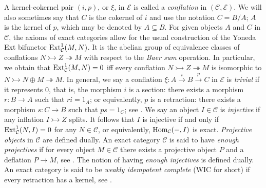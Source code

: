 \documentclass[reqno,12pt]{amsart}
\numberwithin{equation}{section}
\def\Ext{\mbox{\rm Ext}} \def\Tor{\mbox{\rm Tor}}\def\Hom{\mbox{\rm Hom}} \def\dim{\mbox{\rm dim}} \def\Iso{\mbox{\rm Iso}}
\def\dim{\mbox{\rm dim}}\def\Irr{\mbox{\rm Irr}}\def\rad{\mbox{\rm rad}}\def\fg{\mbox{\rm fg}}
\theoremstyle{plain}
\theoremstyle{definition}
\begin{document}
A kernel-cokernel pair $(i,p)$, or $\xi$, in $\mathcal{E}$ is called a {\it conflation} in
$(\mathcal{C},\mathcal{E})$. We will also sometimes say that $C$ is the cokernel of $i$ and
use the notation $C=B/A$; $A$ is the kernel of $p$, which may be denoted by $A\subseteq B$.
For given objects $A$ and $C$ in $\mathcal{C}$, the axioms of exact categories allow
for the usual construction of the Yoneda Ext bifunctor $\Ext^1_{\mathcal{C}}(M,N)$. It is the
abelian group of equivalence classes of conflations $N\rightarrowtail Z\twoheadrightarrow M$
with respect to the {\it Baer sum} operation. In particular, we obtain that
$\Ext^1_{\mathcal{C}}(M,N)=0$ iff every conflation $N\rightarrowtail Z\twoheadrightarrow M$ is
isomorphic to $N\rightarrowtail N\oplus M\twoheadrightarrow M$. In general, we say a conflation
$\xi:A\stackrel{i}\to B \stackrel{p}\to C$ in $\mathcal{E}$ is {\it trivial} if it represents
$0$, that is, the morphism $i$ is a section: there exists a morphism $r:B\to A$ such that
$ri=1_A$; or equivalently, $p$ is a retraction: there exists a morphism $s:C\to B$ such
that $ps=1_C$; see \cite[Remark 7.4]{B10}.
We say an object $I\in\mathcal{C}$ is {\it injective} if any inflation $I\rightarrowtail Z$
splits. It follows that $I$ is injective if and only if $\Ext^1_{\mathcal{C}}(N,I)=0$ for
any $N\in\mathcal{C}$, or equivalently, $\Hom_{\mathcal{C}}(-,I)$ is exact.
{\it Projective objects} in $\mathcal{C}$ are defined dually. An exact category $\mathcal{C}$
is said to have {\it enough projectives} if for every object $M\in\mathcal{C}$ there exists a
projective object $P$ and a deflation $P\to M$, see \cite[Definition 11.9]{B10}. The notion
of having {\it enough injectives} is defined dually.
An exact category is said to be {\it weakly idempotent complete} (WIC for short) if every
retraction has a kernel, see \cite[Section 7]{B10}.
\end{document}
